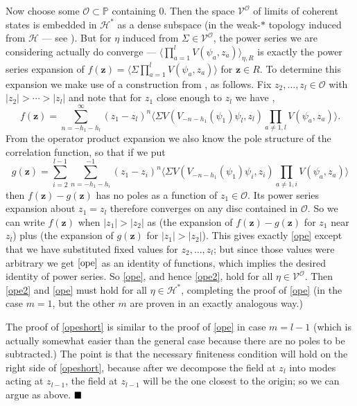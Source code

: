 \documentclass[a4paper,12pt]{article}
\newcommand{\zz}{{\mathbf z}}
\newcommand{\PP}{{\mathbb P}}
\newcommand{\F}{{\mathcal H}}
\newcommand{\OO}{{\mathcal O}}
\newcommand{\V}{{\mathcal V}}
\newcommand{\abs}[1]{\lvert#1\rvert}
\newcommand{\IP}[1]{\langle#1\rangle}
\newcommand{\done}{$\hfill \hfill \blacksquare$ \bigskip}
\begin{document}
Now choose some $\OO \subset \PP$ containing $0$.  Then the space $\V^\OO$ of limits of coherent states 
is embedded in $\F^*$ as a dense 
subspace (in the weak-$*$ topology induced from $\F$ --- see \cite{GG}).
But for $\eta$ induced from $\Sigma \in \V^\OO$, the power
series we are considering actually do converge --- $\IP{\prod_{a=1}^l V(\psi_a, z_a)}_{\eta, R}$ is exactly the power series expansion
of $f(\zz) = \IP{\Sigma \prod_{a=1}^l V(\psi_a, z_a)}$ for $\zz \in R$.  To determine this expansion we make use of
a construction from \cite{Gaberdiel}, as follows.  Fix $z_2, \dots, z_l \in \OO$ with $\abs{z_2} > \cdots > \abs{z_l}$ and 
note that for $z_1$ close enough to $z_l$ we have \cite{DFMS}, \cite{Greview}
\begin{equation}
f(\zz) = \sum_{n=-h_1-h_l}^\infty (z_1 - z_l)^{n} \IP{\Sigma V(V_{-n-h_1}(\psi_1) \psi_l, z_l) \prod_{a \ne 1,l} V(\psi_a, z_a)}.
\end{equation}
From the operator product expansion we also know the pole structure of the correlation function, so that if we put
\begin{equation}
g(\zz) = \sum_{i=2}^{l-1} \sum_{n = - h_1 - h_i}^{-1} (z_1 - z_i)^{n} \IP{\Sigma V(V_{-n-h_1}(\psi_1) \psi_i, z_i) \prod_{a \ne 1,i} V(\psi_a, z_a)}
\end{equation}
then $f(\zz) - g(\zz)$ has no poles as a function of $z_1 \in \OO$.  Its power series expansion about $z_1 = z_l$ therefore converges on any disc contained in $\OO$.
So we can write $f(\zz)$ when $\abs{z_1} > \abs{z_2}$ as (the expansion of $f(\zz) - g(\zz)$ for $z_1$ near $z_l$) plus 
(the expansion of $g(\zz)$ for $\abs{z_1} > \abs{z_2}$).  This gives exactly \eqref{ope} except that we have substituted fixed values for $z_2, \dots, z_l$;
but since those values were arbitrary we get $\eqref{ope}$ as an identity of functions, which implies the desired identity of power series.
So \eqref{ope}, and hence \eqref{ope2}, hold for all $\eta \in \V^\OO$.  Then \eqref{ope2} and \eqref{ope} must
hold for all $\eta \in \F^*$, completing the proof of \eqref{ope} (in the case $m=1$, but the other $m$ are proven in an exactly analogous way.)

The proof of \eqref{opeshort} is similar to the proof of \eqref{ope} in case $m=l-1$ (which is actually somewhat easier than the general case
because there are no poles to be subtracted.)  The point is that the necessary finiteness condition will hold on the right side of \eqref{opeshort},
because after we decompose the field at $z_l$ into modes acting at $z_{l-1}$, the field at $z_{l-1}$ will be the one closest to the origin; so
we can argue as above. \done
\end{document}

